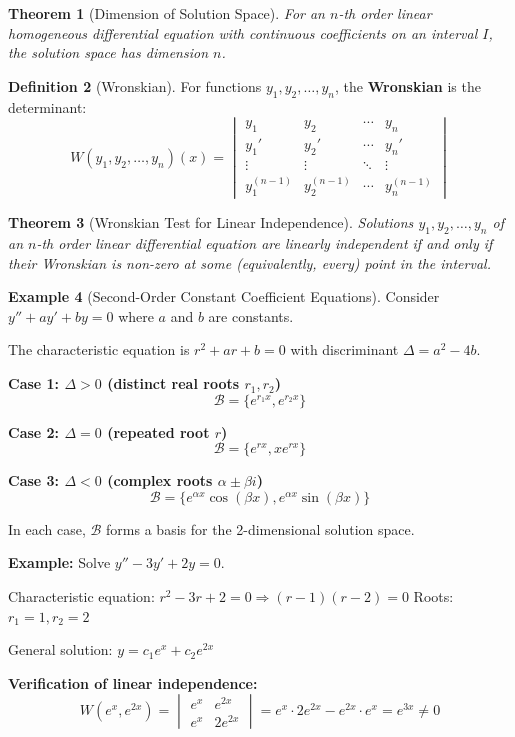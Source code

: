 \documentclass[12pt]{article}
\numberwithin{equation}{section}
\theoremstyle{plain}
\newtheorem{theorem}{Theorem}[section]
\theoremstyle{definition}
\newtheorem{definition}[theorem]{Definition}
\newtheorem{example}[theorem]{Example}
\theoremstyle{remark}
\begin{document}
\begin{theorem}[Dimension of Solution Space]
For an $n$-th order linear homogeneous differential equation with continuous coefficients on an interval $I$, the solution space has dimension $n$.
\end{theorem}

\begin{definition}[Wronskian]
For functions $y_1, y_2, \ldots, y_n$, the \textbf{Wronskian} is the determinant:
$$W(y_1, y_2, \ldots, y_n)(x) = \begin{vmatrix}
y_1 & y_2 & \cdots & y_n\\
y_1' & y_2' & \cdots & y_n'\\
\vdots & \vdots & \ddots & \vdots\\
y_1^{(n-1)} & y_2^{(n-1)} & \cdots & y_n^{(n-1)}
\end{vmatrix}$$
\end{definition}

\begin{theorem}[Wronskian Test for Linear Independence]
Solutions $y_1, y_2, \ldots, y_n$ of an $n$-th order linear differential equation are linearly independent if and only if their Wronskian is non-zero at some (equivalently, every) point in the interval.
\end{theorem}

\begin{example}[Second-Order Constant Coefficient Equations]
Consider $y'' + ay' + by = 0$ where $a$ and $b$ are constants.

The characteristic equation is $r^2 + ar + b = 0$ with discriminant $\Delta = a^2 - 4b$.

\textbf{Case 1: $\Delta > 0$ (distinct real roots $r_1, r_2$)}
$$\mathcal{B} = \{e^{r_1x}, e^{r_2x}\}$$

\textbf{Case 2: $\Delta = 0$ (repeated root $r$)}
$$\mathcal{B} = \{e^{rx}, xe^{rx}\}$$

\textbf{Case 3: $\Delta < 0$ (complex roots $\alpha \pm \beta i$)}
$$\mathcal{B} = \{e^{\alpha x}\cos(\beta x), e^{\alpha x}\sin(\beta x)\}$$

In each case, $\mathcal{B}$ forms a basis for the 2-dimensional solution space.

\textbf{Example:} Solve $y'' - 3y' + 2y = 0$.

Characteristic equation: $r^2 - 3r + 2 = 0 \Rightarrow (r-1)(r-2) = 0$
Roots: $r_1 = 1, r_2 = 2$

General solution: $y = c_1e^x + c_2e^{2x}$

\textbf{Verification of linear independence:}
$$W(e^x, e^{2x}) = \begin{vmatrix} e^x & e^{2x} \\ e^x & 2e^{2x} \end{vmatrix} = e^x \cdot 2e^{2x} - e^{2x} \cdot e^x = e^{3x} \neq 0$$
\end{example}
\end{document}
